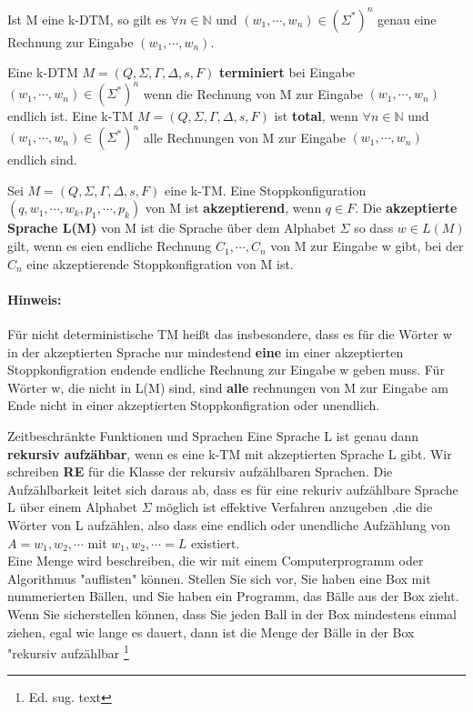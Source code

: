   Ist M eine k-DTM, so gilt es \(\forall n \in \mathbb{N}\) und \((w_1, \cdots, w_n) \in (\Sigma^*)^n\) genau eine Rechnung zur Eingabe \((w_1, \cdots, w_n)\).

  Eine k-DTM \(M = (Q, \Sigma, \Gamma, \Delta, s, F)\) \textbf{terminiert} bei Eingabe \((w_1, \cdots, w_n) \in (\Sigma^*)^n\) wenn die Rechnung von M zur Eingabe \((w_1, \cdots, w_n)\) endlich ist. Eine k-TM \(M = (Q, \Sigma, \Gamma, \Delta, s, F)\) ist \textbf{total}, wenn \(\forall n \in \mathbb{N}\) und \((w_1, \cdots, w_n) \in (\Sigma^*)^n\) alle Rechnungen von M zur Eingabe \((w_1, \cdots, w_n)\) endlich sind.

  Sei \(M = (Q, \Sigma, \Gamma, \Delta, s, F)\) eine k-TM. Eine Stoppkonfiguration \((q, w_1, \cdots, w_k, p_1, \cdots, p_k)\) von M ist \textbf{akzeptierend}, wenn \(q \in F\). Die \textbf{akzeptierte Sprache L(M)} von M ist die Sprache über dem Alphabet \(\Sigma\) so dass \(w \in L(M)\) gilt, wenn es eien endliche Rechnung \(C_1, \cdots, C_n\) von M zur Eingabe w gibt, bei der \(C_n\) eine akzeptierende Stoppkonfigration von M ist. 

  \paragraph*{Hinweis: } 
    Für nicht deterministische TM heißt das insbesondere, dass es für die Wörter w in der  akzeptierten Sprache nur mindestend \textbf{eine} im einer akzeptierten Stoppkonfigration endende endliche Rechnung zur Eingabe w geben muss. Für Wörter w, die nicht in L(M) sind, sind \textbf{alle} rechnungen von M zur Eingabe am Ende nicht in einer akzeptierten Stoppkonfigration oder unendlich.

    Zeitbeschränkte Funktionen und Sprachen
  Eine Sprache L ist genau dann \textbf{rekursiv aufzähbar}, wenn es eine k-TM mit akzeptierten Sprache L gibt. Wir schreiben \textbf{RE} für die Klasse der rekursiv aufzählbaren Sprachen. Die Aufzählbarkeit leitet sich daraus ab, dass es für eine rekuriv aufzählbare Sprache L über einem Alphabet \(\Sigma\) möglich ist effektive Verfahren anzugeben ,die die Wörter von L aufzählen, also dass eine endlich oder unendliche Aufzählung von \(A = w_1, w_2, \cdots \) mit \( {w_1, w_2, \cdots} = L\) existiert.\vspace{0.5cm}
  \\
  Eine Menge wird beschreiben, die wir mit einem Computerprogramm oder Algorithmus "auflisten" können. Stellen Sie sich vor, Sie haben eine Box mit nummerierten Bällen, und Sie haben ein Programm, das Bälle aus der Box zieht. Wenn Sie sicherstellen können, dass Sie jeden Ball in der Box mindestens einmal ziehen, egal wie lange es dauert, dann ist die Menge der Bälle in der Box "rekursiv aufzählbar
  \footnote{Ed. sug. text}

